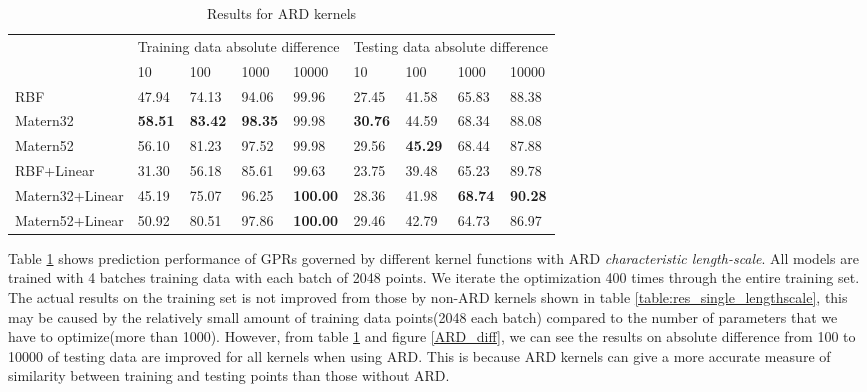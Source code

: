 \documentclass[11pt,a4paper]{article}
\theoremstyle{definition}
\numberwithin{equation}{section}
\begin{document}
	\begin{table}[h!]
		\centering
		\begin{tabular}{l|llll|llll} 
			\toprule
			& \multicolumn{4}{l|}{Training data absolute difference}             & \multicolumn{4}{l}{Testing data absolute difference}               \\
			& 10             & 100            & 1000           & 10000           & 10             & 100            & 1000           & 10000           \\ 
			\hline\hline
			RBF             & 47.94          & 74.13          & 94.06          & 99.96           & 27.45          & 41.58          & 65.83          & 88.38           \\
			Matern32        & \textbf{58.51} & \textbf{83.42} & \textbf{98.35} & 99.98           & \textbf{30.76} & 44.59          & 68.34          & 88.08           \\
			Matern52        & 56.10          & 81.23          & 97.52          & 99.98           & 29.56          & \textbf{45.29} & 68.44          & 87.88           \\
			RBF+Linear      & 31.30          & 56.18          & 85.61          & 99.63           & 23.75          & 39.48          & 65.23          & 89.78           \\
			Matern32+Linear & 45.19          & 75.07          & 96.25          & \textbf{100.00} & 28.36          & 41.98          & \textbf{68.74} & \textbf{90.28}  \\
			Matern52+Linear & 50.92          & 80.51          & 97.86          & \textbf{100.00} & 29.46          & 42.79          & 64.73          & 86.97           \\
			\bottomrule
		\end{tabular}
		\caption{Results for ARD kernels}
		\label{ARD_res}
	\end{table}
	
	Table \ref{ARD_res} shows prediction performance of GPRs governed by different kernel functions with ARD \textit{characteristic length-scale}.
	All models are trained with 4 batches training data with each batch of 2048 points. We iterate the optimization 400 times through the entire training set. The actual results on the training set is not improved from those by non-ARD kernels shown in table \ref{table:res_single_lengthscale}, this may be caused by the relatively small amount of training data points(2048 each batch) compared to the number of parameters that we have to optimize(more than 1000). However, from table \ref{ARD_res} and figure \ref{ARD_diff}, we can see the results on absolute difference from 100 to 10000 of testing data are improved for all kernels when using ARD. This is because ARD kernels can give a more accurate measure of similarity between training and testing points than those without ARD.
	
\end{document}
